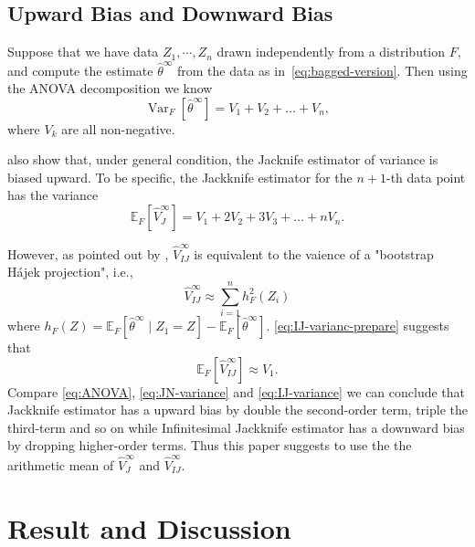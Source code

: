 \documentclass[11pt]{article}
\begin{document}
\subsection{Upward Bias and Downward Bias}
Suppose that we have data $Z_1, \cdots, Z_n$ drawn independently from a distribution $F$, and compute the estimate $\hat{\theta}^{\infty}$ from the data as in~\ref{eq:bagged-version}.
Then using the ANOVA decomposition \cite{efron1981jackknife} we know
\begin{equation}
	\label{eq:ANOVA}
	\operatorname{Var}_{F}\left[\hat{\theta}^{\infty}\right]=V_{1}+V_{2}+\ldots+V_{n},
\end{equation}
where $V_k$ are all non-negative.

\cite{efron1981jackknife} also show that, under general condition, the Jacknife estimator of variance is biased upward. To be specific, the Jackknife estimator for the $n+1$-th data point has the variance 
\begin{equation}
	\label{eq:JN-variance}
	\mathbb{E}_{F}\left[\widehat{V}_{J}^{\infty}\right]=V_{1}+2 V_{2}+3 V_{3}+\ldots+n V_{n}.
\end{equation}

However, as pointed out by \cite{IJ, efron2012model}, $\hat{V}_{IJ}^{\infty}$ is equivalent to the vaience of a "bootstrap Hájek projection", i.e.,
\begin{equation}
	\label{eq:IJ-varianc-prepare}
	\widehat{V}_{I J}^{\infty} \approx \sum_{i=1}^{n} h_{F}^{2}\left(Z_{i}\right)
\end{equation}
where $h_{F}(Z)=\mathbb{E}_{F}\left[\hat{\theta}^{\infty} \mid Z_{1}=Z\right]-\mathbb{E}_{F}\left[\hat{\theta}^{\infty}
\right]$.
\eqref{eq:IJ-varianc-prepare} suggests that 
\begin{equation}
	\label{eq:IJ-variance}
	\mathbb{E}_{F}\left[\widehat{V}_{I J}^{\infty}\right] \approx V_{1}.
\end{equation}
Compare \eqref{eq:ANOVA}, \eqref{eq:JN-variance} and \eqref{eq:IJ-variance} we can conclude that Jackknife estimator has a upward bias by double the second-order term, triple the third-term and so on while Infinitesimal Jackknife estimator has a downward bias by dropping higher-order terms.
Thus this paper suggests to use the the arithmetic mean of $\widehat{V}_{J}^{\infty}$ and $\widehat{V}_{IJ}^{\infty}$.

\section{Result and Discussion}
\end{document}
